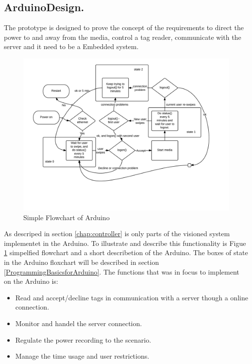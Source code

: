 \subsection{ArduinoDesign.}    

The prototype is designed to prove the concept of the requirements to direct the power to and away from the media, control a tag reader, communicate with the server and it need to be a Embedded system. \newline


\begin{figure}[h]
	\centering
		\includegraphics{images/arduinoFlowchart.png}
	\caption{Simple Flowchart of Arduino}
	\label{fig:arduinoFlowchart}
\end{figure}

As descriped in section \ref{chap:controller} is only parts of the visioned system implementet in the Arduino. 
To illustrate and describe this functionality is Figue \ref{fig:arduinoFlowchart} simpelfied flowchart and a  short describetion of the Arduino. The boxes of state in the Arduino floxchart will be described in section \ref{ProgrammingBasicsforArduino}.
The functions that was in focus to implement on the Arduino is: 

\begin{itemize}
	\item Read and accept/decline tags in communication with a server though a online connection.
	\item Monitor and handel the server connection.
	\item Regulate the power recording to the scenario.
	\item Manage the time usage and user restrictions. 
\end{itemize}

